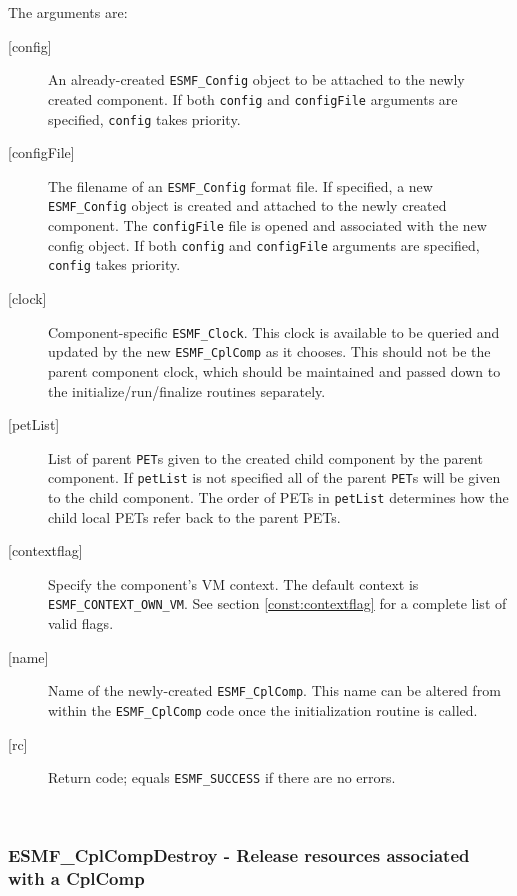    The arguments are:
   \begin{description}
   \item[{[config]}]
     An already-created {\tt ESMF\_Config} object to be attached to the newly
     created component.
     If both {\tt config} and {\tt configFile} arguments are specified,
     {\tt config} takes priority.
   \item[{[configFile]}]
     The filename of an {\tt ESMF\_Config} format file.
     If specified, a new {\tt ESMF\_Config} object is created and attached to the
     newly created component. The {\tt configFile} file is opened and associated
     with the new config object.
     If both {\tt config} and {\tt configFile} arguments are specified,
     {\tt config} takes priority.
   \item[{[clock]}]
     \begin{sloppypar}
     Component-specific {\tt ESMF\_Clock}.  This clock is available to be
     queried and updated by the new {\tt ESMF\_CplComp} as it chooses.
     This should
     not be the parent component clock, which should be maintained and passed
     down to the initialize/run/finalize routines separately.
     \end{sloppypar}
   \item[{[petList]}]
     List of parent {\tt PET}s given to the created child component by the
     parent component. If {\tt petList} is not specified all of the
     parent {\tt PET}s will be given to the child component. The order of
     PETs in {\tt petList} determines how the child local PETs refer back to
     the parent PETs.
   \item[{[contextflag]}]
     Specify the component's VM context. The default context is
     {\tt ESMF\_CONTEXT\_OWN\_VM}. See section \ref{const:contextflag} for a
     complete list of valid flags.
   \item[{[name]}]
     Name of the newly-created {\tt ESMF\_CplComp}.  This name can be altered
     from within the {\tt ESMF\_CplComp} code once the initialization routine
     is called.
   \item[{[rc]}]
     Return code; equals {\tt ESMF\_SUCCESS} if there are no errors.
   \end{description}
   
 
\mbox{}\hrulefill\ 
 
\subsubsection [ESMF\_CplCompDestroy] {ESMF\_CplCompDestroy - Release resources associated with a CplComp}


